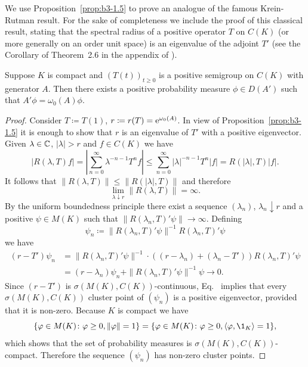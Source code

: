 We use Proposition~\ref{prop:b3-1.5} to prove an analogue of the famous Krein-Rutman result.
For the sake of completeness we include the proof of this classical result, stating that the spectral radius of a positive operator $T$ on $C(K)$ (or more generally on an order unit space) is an eigenvalue of the adjoint $T'$ (see the Corollary of Theorem~2.6 in the appendix of \textcite{schaefer:1966}).
\begin{theorem}\label{thm:b3-1.6}
	Suppose $K$ is compact and $(T(t))_{t \geq 0}$ is a positive semigroup on $C(K)$ with generator $A$.
	Then there exists a positive probability measure $\phi \in D(A')$ such that $A'\phi = \omega_{0}(A)\phi$.
\end{theorem}
\begin{proof}
	Consider $T \coloneq T(1)$, $r \coloneq r(T) = \mathrm{e}^{\omega_{0}(A)}$.
	In view of Proposition~\ref{prop:b3-1.5} it is enough to show that $r$ is an eigenvalue of\/ $T'$ with a positive eigenvector.
	Given $\lambda \in \mathbb{C}$, $|\lambda| > r$ and $f \in C(K)$ we have
	\[
	|R(\lambda,T)f| = \left|\sum_{n=0}^{\infty} \lambda^{-n-1} T^{n}f\right| \leq \sum_{n=0}^{\infty} |\lambda|^{-n-1} T^{n}|f| = R(|\lambda|,T) |f|.
	\]
	It follows that $\|R(\lambda,T)\| \leq \|R(|\lambda|,T)\|$ and therefore
	\begin{equation}\label{eq:b3-1.15}
		\lim_{\lambda \downarrow r}\|R(\lambda,T)\| = \infty.
	\end{equation}
	By the uniform boundedness principle there exist a sequence $(\lambda_{n})$, $\lambda_{n} \downarrow r$ and a positive $\psi \in M(K)$ such that $\|R(\lambda_{n},T)'\psi\| \to \infty$.
	Defining 
    \[
    \psi_{n} \coloneq \|R(\lambda_{n},T)'\psi\|^{-1}R(\lambda_{n},T)'\psi
    \] we have
	\begin{equation}\label{eq:b3-1.16}
		\begin{split}
		(r - T')\psi_{n} & = \|R(\lambda_{n},T)'\psi\|^{-1}\cdot((r-\lambda_{n}) + (\lambda_{n} - T'))R(\lambda_{n},T)'\psi\\ 
		& = (r-\lambda_{n})\psi_{n} + \|R(\lambda_{n},T)'\psi\|^{-1}\psi \to 0.
		\end{split}
	\end{equation}
	Since $(r - T')$ is $\sigma(M(K),C(K))$-continuous, Eq.~ implies that every $\sigma(M(K),C(K))$ cluster point of\/ $(\psi_{n})$ is a positive eigenvector, provided that it is non-zero.
	Because $K$ is compact we have 
%
\[
	\{\phi \in M(K) \colon \phi \geq 0, \|\phi\| = 1\} 
	= \{\phi \in M(K) \colon \phi \geq 0, \langle \phi,\1_{K} \rangle = 1\} , 
\]
which shows that the set of probability measures is $\sigma(M(K),C(K))$-compact.
	Therefore the sequence $(\psi_{n})$ has non-zero cluster points.
\end{proof}
